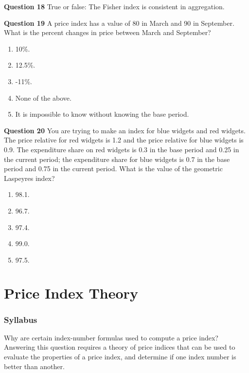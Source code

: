 \documentclass[]{article}
\begin{document}
\textbf{Question 18} True or false: The Fisher index is consistent in aggregation.

\textbf{Question 19} A price index has a value of 80 in March and 90 in September. What is the percent changes in price between March and September?

\begin{enumerate}
\def\labelenumi{\alph{enumi})}
\item
  10\%.
\item
  12.5\%.
\item
  -11\%.
\item
  None of the above.
\item
  It is impossible to know without knowing the base period.
\end{enumerate}

\textbf{Question 20} You are trying to make an index for blue widgets and red widgets. The price relative for red widgets is 1.2 and the price relative for blue widgets is 0.9. The expenditure share on red widgets is 0.3 in the base period and 0.25 in the current period; the expenditure share for blue widgets is 0.7 in the base period and 0.75 in the current period. What is the value of the geometric Laspeyres index?

\begin{enumerate}
\def\labelenumi{\alph{enumi})}
\item
  98.1.
\item
  96.7.
\item
  97.4.
\item
  99.0.
\item
  97.5.
\end{enumerate}

\hypertarget{part-price-index-theory}{%
\part{Price Index Theory}\label{part-price-index-theory}}

\hypertarget{syllabus-1}{%
\section{Syllabus}\label{syllabus-1}}

Why are certain index-number formulas used to compute a price index? Answering this question requires a theory of price indices that can be used to evaluate the properties of a price index, and determine if one index number is better than another.
\end{document}
